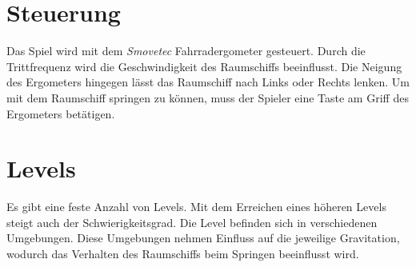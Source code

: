 \section{Steuerung}
Das Spiel wird mit dem \textit{Smovetec} Fahrradergometer gesteuert. Durch die Trittfrequenz wird die Geschwindigkeit des Raumschiffs beeinflusst. Die Neigung des Ergometers hingegen lässt das Raumschiff nach Links oder Rechts lenken. Um mit dem Raumschiff springen zu können, muss der Spieler eine Taste am Griff des Ergometers betätigen.

\section{Levels}
Es gibt eine feste Anzahl von Levels. Mit dem Erreichen eines höheren Levels steigt auch der Schwierigkeitsgrad. Die Level befinden sich in verschiedenen Umgebungen. Diese Umgebungen nehmen Einfluss auf die jeweilige Gravitation, wodurch das Verhalten des Raumschiffs beim Springen beeinflusst wird.
